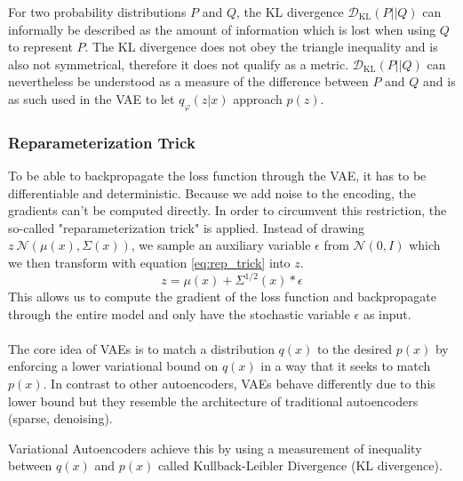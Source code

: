 \documentclass[twoside,11pt,a4paper]{article}
\theoremstyle{break}
\begin{document}
For two probability distributions $P$ and $Q$, the KL divergence $\mathcal{D}_{\mathrm{KL}}(P||Q)$ can informally be described as the amount of information which is lost when using $Q$ to represent $P$.
The KL divergence does not obey the triangle inequality and is also not symmetrical, therefore it does not qualify as a metric.
$\mathcal{D}_{\mathrm{KL}}(P||Q)$ can nevertheless be understood as a measure of the difference between $P$ and $Q$ and is as such used in the VAE to let $q_\varphi(z|x)$ approach $p(z)$.





\subsubsection{Reparameterization Trick}
To be able to backpropagate the loss function through the VAE, it has to be differentiable and deterministic.
Because we add noise to the encoding, the gradients can't be computed directly. In order to circumvent this restriction, the so-called "reparameterization trick" is applied.
Instead of drawing $z ~ \mathcal{N}(\mu(x), \Sigma(x))$, we sample an auxiliary variable $\epsilon$ from $\mathcal{N}(0, I)$ which we then transform with equation \ref{eq:rep_trick} into $z$.
\begin{equation}
  \label{eq:rep_trick}
  z = \mu(x) + \Sigma^{1/2}(x)*\epsilon
\end{equation}
This allows us to compute the gradient of the loss function and backpropagate through the entire model and only have the stochastic variable $\epsilon$ as input.\\\\

The core idea of VAEs is to match a distribution $q(x)$ to the desired $p(x)$ by enforcing a lower variational bound on $q(x)$ in a way that it seeks to match $p(x)$.
In contrast to other autoencoders, VAEs behave differently due to this lower bound but they resemble the architecture of traditional autoencoders (sparse, denoising).



Variational Autoencoders achieve this by using a measurement of inequality between $q(x)$ and $p(x)$ called Kullback-Leibler Divergence (KL divergence).

\end{document}
